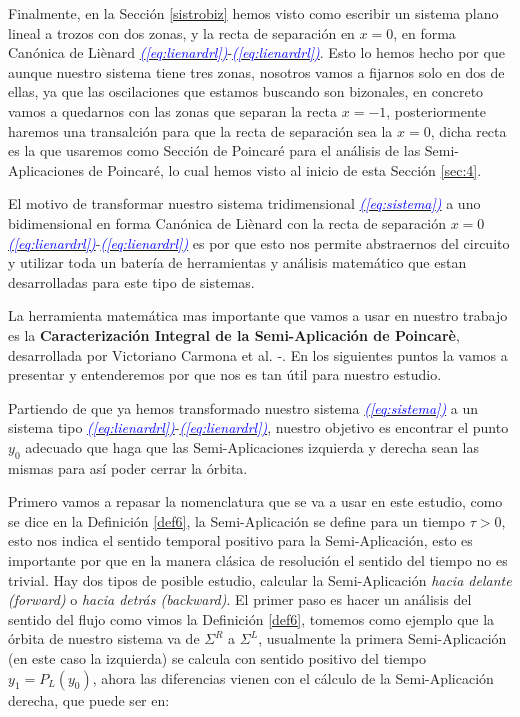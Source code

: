 \documentclass[12pt,a4paper]{report} %
\newcommand{\eref}[1]{\hyperref[#1]{\textcolor{blue}{\textit{(\ref*{#1})}}}}
\begin{document}
	\vspace{0.5cm}\noindent Finalmente, en la Sección \ref{sistrobiz} hemos visto como escribir un sistema plano lineal a trozos con dos zonas, y la recta de separación en $x=0$, en forma Canónica de Liènard \eref{eq:lienardrl}-\eref{eq:lienardrl}. Esto lo hemos hecho por que aunque nuestro sistema tiene tres zonas, nosotros vamos a fijarnos solo en dos de ellas, ya que las oscilaciones que estamos buscando son bizonales, en concreto vamos a quedarnos con las zonas que separan la recta $x=-1$, posteriormente haremos una transalción para que la recta de separación sea la $x=0$, dicha recta es la que usaremos como Sección de Poincaré para el análisis de las Semi-Aplicaciones de Poincaré, lo cual hemos visto al inicio de esta Sección \ref{sec:4}.
	
	\vspace{0.5cm}\noindent El motivo de transformar nuestro sistema tridimensional \eref{eq:sistema} a uno bidimensional en forma Canónica de Liènard con la recta de separación $x=0$ \eref{eq:lienardrl}-\eref{eq:lienardrl} es por que esto nos permite abstraernos del circuito y utilizar toda un batería de herramientas y análisis matemático que estan desarrolladas para este tipo de sistemas.
	
	\vspace{0.5cm}\noindent La herramienta matemática mas importante que vamos a usar en nuestro trabajo es la \textbf{Caracterización Integral de la Semi-Aplicación de Poincarè}, desarrollada por Victoriano Carmona et al. \cite{properties}-\cite{caracterizacion}. En los siguientes puntos la vamos a presentar y entenderemos por que nos es tan útil para nuestro estudio.
	\newpage
	
	Partiendo de que ya hemos transformado nuestro sistema \eref{eq:sistema} a un sistema tipo \eref{eq:lienardrl}-\eref{eq:lienardrl}, nuestro objetivo es encontrar el punto $y_0$ adecuado que haga que las Semi-Aplicaciones izquierda y derecha sean las mismas para así poder cerrar la órbita. 
	
	\vspace{0.5cm}\noindent Primero vamos a repasar la nomenclatura que se va a usar en este estudio, como se dice en la Definición \ref{def6}, la Semi-Aplicación se define para un tiempo $\tau>0$, esto nos indica el sentido temporal positivo para la Semi-Aplicación, esto es importante por que en la manera clásica de resolución el sentido del tiempo no es trivial. Hay dos tipos de posible estudio, calcular la Semi-Aplicación \textit{hacia delante (forward)} o \textit{hacia detrás (backward)}. El primer paso es hacer un análisis del sentido del flujo como vimos la Definición \ref{def6}, tomemos como ejemplo que la órbita de nuestro sistema va de $\varSigma^R$ a $\varSigma^L$, usualmente la primera Semi-Aplicación (en este caso la izquierda) se calcula con sentido positivo del tiempo $y_1=P_L(y_0)$, ahora las diferencias vienen con el cálculo de la Semi-Aplicación derecha, que puede ser en:
	
\end{document}
